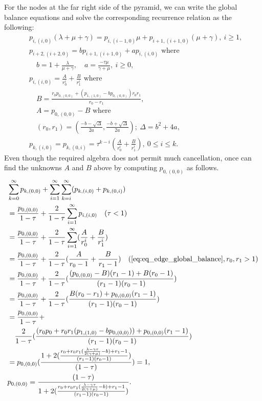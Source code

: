 \documentclass[sigconf,draft]{acmart}
\begin{document}
For the nodes at the far right side of the pyramid, we can write the global balance equations and solve the corresponding recurrence relation as the following:
\begin{equation}
  \begin{split}
    & p_{i,(i,0)}(\lambda+\mu+\gamma) = p_{i,(i-1,0)}\mu + p_{i+1,(i+1,0)}(\mu+\gamma),~i \geq 1, \\
    & p_{i+2,(i+2,0)} = b p_{i+1,(i+1,0)} + a p_{i,(i,0)} \text{ where } \\
    & \quad b=1+\frac{\lambda}{\mu+\gamma}, \quad a=\frac{-\tau\mu}{\gamma+\mu},~i \geq 0, \\
    & p_{i,(i,0)} = \frac{A}{r_0^i} + \frac{B}{r_1^i} \text{ where } \\
    & \quad B = \frac{r_0p_{0,(0,0)} + (p_{1,(1,0)}-bp_{0,(0,0)})r_0r_1}{r_0-r_1}, \\
    & \quad A = p_{0,(0,0)}-B \text{ where } \\
    & \quad (r_0, r_1) = (\frac{-b-\sqrt{\Delta}}{2a}, \frac{-b+\sqrt{\Delta}}{2a});~\Delta=b^2+4a, \\
    & p_{k,(i,0)} = p_{k,(0,i)} = \tau^{k-i}(\frac{A}{r_0^i} + \frac{B}{r_1^i}),~0 \leq i \leq k.~\label{eq:eq_edge_global_balance}
  \end{split}
\end{equation}
Even though the required algebra does not permit much cancellation, once can find the unknowns $A$ and $B$ above by computing $p_{0,(0,0)}$ as follows.
\begin{equation}
  \begin{split}
    & \sum_{k=0}^{\infty} p_{k,(0,0)} + \sum_{i=1}^{\infty} \sum_{k=i}^{\infty} (p_{k,(i,0)} + p_{k,(0,i)}) \\
    &= \frac{p_{0,(0,0)}}{1-\tau} + \frac{2}{1-\tau}\sum_{i=1}^{\infty}p_{i,(i,0)} \quad (\tau < 1) \\
    &= \frac{p_{0,(0,0)}}{1-\tau} + \frac{2}{1-\tau}\sum_{i=1}^{\infty}(\frac{A}{r_0^i} + \frac{B}{r_1^i}) \\
    &= \frac{p_{0,(0,0)}}{1-\tau} + \frac{2}{1-\tau}(\frac{A}{r_0-1} + \frac{B}{r_1-1}) \quad ({\eqref{eq:eq_edge_global_balance}},r_0,r_1 > 1) \\
    &= \frac{p_{0,(0,0)}}{1-\tau} + \frac{2}{1-\tau}(\frac{(p_{0,(0,0)}-B)(r_1-1) + B(r_0-1)}{(r_1-1)(r_0-1)}) \\
    &= \frac{p_{0,(0,0)}}{1-\tau} + \frac{2}{1-\tau}(\frac{B(r_0-r_1)+p_{0,(0,0)}(r_1-1)}{(r_1-1)(r_0-1)}) \\
    &= \frac{p_{0,(0,0)}}{1-\tau} + \\
    & \quad \frac{2}{1-\tau}(\frac{(r_0p_0+r_0r_1(p_{1,(1,0)}-bp_{0,(0,0)}))+p_{0,(0,0)}(r_1-1)}{(r_1-1)(r_0-1)}) \\
    &= p_{0,(0,0)}(\frac{1+2(\frac{r_0+r_0r_1(\frac{\lambda-\gamma\tau}{2(\gamma+\mu)}-b)+r_1-1}{(r_1-1)(r_0-1)})}{(1-\tau)}) = 1, \\
    & p_{0,(0,0)} = \frac{(1-\tau)}{1+2(\frac{r_0+r_0r_1(\frac{\lambda-\gamma\tau}{2(\gamma+\mu)}-b)+r_1-1}{(r_1-1)(r_0-1)})}.~\label{eq:eq_finding_p_0}
  \end{split}
\end{equation}
\end{document}
